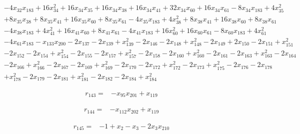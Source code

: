 \documentclass[10pt,letterpaper]{article}
\theoremstyle{remark}\newtheorem{remark}[theorem]{Remark}
\begin{document}
\begin{align*}
&-4x_{32}x_{183}+16x_{34}^{2}+16x_{34}x_{35}+16x_{34}x_{38}+16x_{34}x_{41}+32x_{34}x_{60}+16x_{34}x_{61}-8x_{34}x_{183}+4x_{35}^{2}\\
&+8x_{35}x_{38}+8x_{35}x_{41}+16x_{35}x_{60}+8x_{35}x_{61}-4x_{35}x_{183}+4x_{38}^{2}+8x_{38}x_{41}+16x_{38}x_{60}+8x_{38}x_{61}\\
&-4x_{38}x_{183}+4x_{41}^{2}+16x_{41}x_{60}+8x_{41}x_{61}-4x_{41}x_{183}+16x_{60}^{2}+16x_{60}x_{61}-8x_{60}x_{183}+4x_{61}^{2}\\
&-4x_{61}x_{183}-x_{133}x_{200}-2x_{137}-2x_{139}+x_{139}^{2}-2x_{146}-2x_{148}+x_{148}^{2}-2x_{149}+2x_{150}-2x_{151}+x_{151}^{2}\\
&-2x_{152}-2x_{154}+x_{154}^{2}-2x_{155}-2x_{157}+x_{157}^{2}-2x_{158}-2x_{160}+x_{160}^{2}-2x_{161}-2x_{163}+x_{163}^{2}-2x_{164}\\
&-2x_{166}+x_{166}^{2}-2x_{167}-2x_{169}+x_{169}^{2}-2x_{170}-2x_{172}+x_{172}^{2}-2x_{173}+x_{175}^{2}-2x_{176}-2x_{178}\\
&+x_{178}^{2}-2x_{179}-2x_{181}+x_{181}^{2}-2x_{182}-2x_{184}+x_{184}^{2}
\end{align*}

\begin{align*}
r_{143}={}&-x_{95}x_{201}+x_{119}
\end{align*}

\begin{align*}
r_{144}={}&-x_{112}x_{202}+x_{119}
\end{align*}

\begin{align*}
r_{145}={}&-1+x_{2}-x_{3}-2x_{3}x_{210}
\end{align*}
\end{document}
